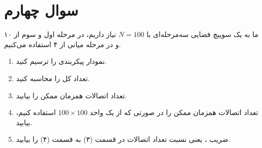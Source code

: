 \section{سوال چهارم}



ما به یک سوییچ فضایی سه‌مرحله‌ای با $N=100 $ نیاز داریم، در مرحله اول و سوم از ۱۰  و در مرحله میانی از ۴  استفاده می‌کنیم.

\begin{enumerate}
	\item 
	نمودار پیکربندی را ترسیم کنید.
	
	
	\item 
	تعداد کل  را محاسبه کنید.
	
	
	\item 
	تعداد اتصالات همزمان ممکن را بیابید.
	
	
	\item 
	تعداد اتصالات همزمان ممکن را در صورتی که از یک  واحد $100 \times 100 $ استفاده کنیم، بیابید.
	
	
	\item 
	ضریب ، یعنی نسبت تعداد اتصالات در قسمت (۳) به قسمت (۴) را بیابید.
\end{enumerate}
